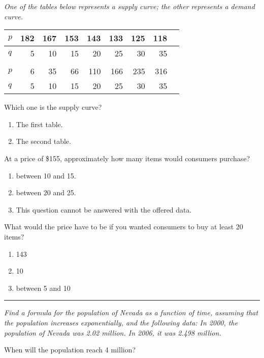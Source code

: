 \documentclass[12pt]{article}
\begin{document}
\bigskip
{\problem[15 pts] \em One of the tables below represents a supply
  curve; the other represents a demand curve.}
\begin{center}
\begin{tabular}{l|r|r|r|r|r|r|r|r|}
\hline
$p$ & 182 & 167 & 153 & 143 & 133 & 125 & 118 \\
\hline
$q$ & 5 & 10 & 15 & 20 & 25 & 30 & 35 \\
\hline \\



\hline
$p$ & 6 & 35 & 66 & 110 & 166 & 235 & 316 \\
\hline
$q$ & 5 & 10 & 15 & 20 & 25 & 30 & 35 \\
\hline
\end{tabular}
\end{center}
\noindent
Which  one is the supply curve?
\begin{enumerate}
\item The first table.
\item The second table.
\end{enumerate}
\noindent
At a price of \$155, approximately how many items would consumers
purchase?
\begin{enumerate}
\item between 10 and 15.
\item between 20 and 25.
\item This question cannot be answered with the offered data.
\end{enumerate}
\noindent
What would the price have to be if you wanted consumers to buy at
least 20 items?
\begin{enumerate}
\item 143
\item 10
\item between 5 and 10
\end{enumerate}
\hrule
{\problem[10 pts] \em Find a formula for the population of Nevada as a
  function of time, assuming that the population increases
  exponentially, and the following data:  In 2000, the population of
  Nevada was 2.02 million.  In 2006, it was 2.498 million.}
\vspace{2.5cm}
\begin{flushright}
\end{flushright}
\noindent
When will the population reach 4 million?
\vspace{2.5cm}
\begin{flushright}
\end{flushright}
\end{document}
